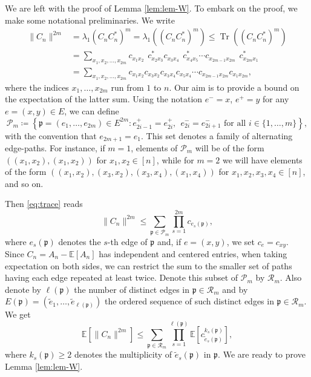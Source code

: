 \documentclass[11pt,oneside]{amsart}
\theoremstyle{plain}
\numberwithin{equation}{section}
\newcommand{\E}{\mathbb{E}}
\newcommand{\centeredentry}{{c}}
\newcommand{\centered}{C_n}
\newcommand{\centeredstar}{{C^*_n}}
\newcommand{\pat}{\mathfrak{p}}
\DeclareMathOperator{\trace}{Tr}
\begin{document}
We are left with the proof of Lemma \ref{lem:lem-W}. To embark on the proof, we make some notational preliminaries. We write
\begin{equation} \label{eq:trace}
    \begin{split}
\|\centered\|^{2m}
&=\lambda_1(\centered\centeredstar)^{m}
= \lambda_1((\centered\centeredstar)^{m})
\le \trace((\centered\centeredstar)^m)\\
&= \sum_{x_1,x_2,\dots,x_{2m}} \centeredentry_{x_1 x_2}\phantom{^*} \centeredentry^*_{x_2 x_3} \centeredentry_{x_3 x_4}\phantom{^*} \centeredentry^*_{x_4 x_5} \cdots \centeredentry_{x_{2m-1} x_{2m}}\phantom{^*} \centeredentry^*_{x_{2m} x_{1}}\\
&= \sum_{x_1,x_2,\dots,x_{2m}} \centeredentry_{x_1 x_2} \centeredentry_{x_3 x_2} \centeredentry_{x_3 x_4} \centeredentry_{x_5 x_4} \cdots \centeredentry_{x_{2m-1} x_{2m}} \centeredentry_{x_{1} x_{2m}},
\end{split}\end{equation}
where the indices $x_1,\dots,x_{2m}$ run from $1$ to $n$.
Our aim is to provide a bound on the expectation of the latter sum.
Using the notation $e^-=x$, $e^+=y$ for any $e=(x,y) \in E$, we can define
\begin{equation}
    \mathcal{P}_m\coloneq \left\{ \pat=(e_1,\dots,e_{2m}) \in E^{2m} : e_{2i-1}^+=e_{2i}^+ ,\ \ e_{2i}^-=e_{2i+1}^{-} \text{ for all } i \in \{1,\dots,m\} \right\},
\end{equation}
with the convention that $e_{2m+1}=e_1$. This set denotes a family of alternating edge-paths. 
For instance, if $m=1$, elements of $\mathcal{P}_m$ will be of the form $((x_1,x_2),(x_1,x_2))$ for $x_1,x_2 \in [n]$, while for $m=2$ we will have elements of the form $((x_1,x_2),(x_3,x_2),(x_3,x_4),(x_1,x_4))$ for $x_1,x_2,x_3,x_4 \in [n]$, and so on.

Then \eqref{eq:trace} reads
\begin{equation}
    \|\centered\|^{2m}\le \sum_{\pat \in \mathcal{P}_m} \prod_{s=1}^{2m} \centeredentry_{e_s(\pat)},
\end{equation}
where $e_s(\pat)$ denotes the $s$-th edge of $\pat$ and, if $e=(x,y)$, we set $\centeredentry_{e}=\centeredentry_{xy}$. Since $\centered=A_n-\E[A_n]$ has independent and centered entries, when taking expectation on both sides, we can restrict the sum to the smaller set of paths having each edge repeated at least twice.
Denote this subset of $\mathcal P_m$ by $\mathcal{R}_m$. Also denote by ${\ell(\pat)}$ the number of distinct edges in $\pat \in \mathcal{R}_m$ and by $E(\pat)=(\tilde{e}_1,\dots,\tilde{e}_{{\ell(\pat)}})$ the ordered sequence of such distinct edges in $\pat \in \mathcal{R}_m$. We get
\begin{equation} \label{eq:trace2}
    \E[\|\centered\|^{2m}] \le\sum_{\pat \in \mathcal{R}_m} \prod_{s=1}^{{\ell(\pat)}} \E\left[\centeredentry_{\tilde{e}_s(\pat)}^{k_s(\pat)}\right],
\end{equation}
where $k_s(\pat)\ge 2$ denotes the multiplicity of $\tilde e_s(\pat)$ in $\pat$. 
We are ready to prove Lemma \ref{lem:lem-W}.
\end{document}
